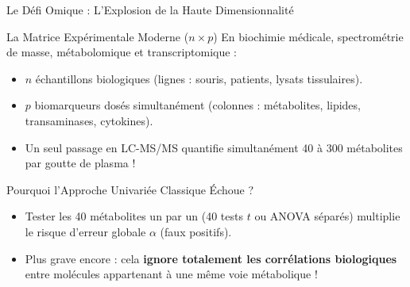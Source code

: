\documentclass[aspectratio=169,10pt]{beamer}
\begin{document}
\begin{frame}{Le Défi Omique : L'Explosion de la Haute Dimensionnalité}
  \begin{biobox}{La Matrice Expérimentale Moderne ($n \times p$)}
    \footnotesize
    En biochimie médicale, spectrométrie de masse, métabolomique et transcriptomique :
    \begin{itemize}
      \item $n$ échantillons biologiques (lignes : souris, patients, lysats tissulaires).
      \item $p$ biomarqueurs dosés simultanément (colonnes : métabolites, lipides, transaminases, cytokines).
      \item Un seul passage en LC-MS/MS quantifie simultanément 40 à 300 métabolites par goutte de plasma !
    \end{itemize}
  \end{biobox}
  \vspace{1mm}
  \begin{warnbox}{Pourquoi l'Approche Univariée Classique Échoue ?}
    \footnotesize
    \begin{itemize}
      \item Tester les 40 métabolites un par un (40 tests $t$ ou ANOVA séparés) multiplie le risque d'erreur globale $\alpha$ (faux positifs).
      \item Plus grave encore : cela \textbf{ignore totalement les corrélations biologiques} entre molécules appartenant à une même voie métabolique !
    \end{itemize}
  \end{warnbox}
\end{frame}
\end{document}
